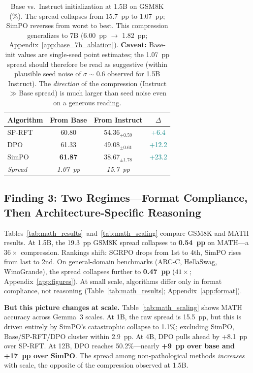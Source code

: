 \documentclass{article}
\newcommand{\sprft}{SP-RFT}
\begin{document}
\begin{table}[t]
\centering
\caption{Base vs.\ Instruct initialization at 1.5B on GSM8K (\%). The spread collapses from 15.7~pp to 1.07~pp; SimPO reverses from worst to best. This compression generalizes to 7B (6.00~pp $\to$ 1.82~pp; Appendix~\ref{app:base_7b_ablation}). \textbf{Caveat:} Base-init values are single-seed point estimates; the 1.07~pp spread should therefore be read as suggestive (within plausible seed noise of $\sigma{\sim}0.6$ observed for 1.5B Instruct). The \emph{direction} of the compression (Instruct$\gg$Base spread) is much larger than seed noise even on a generous reading.}
\label{tab:base_ablation}
\small
\begin{tabular}{@{}lccc@{}}
\toprule
\textbf{Algorithm} & \textbf{From Base} & \textbf{From Instruct} & \textbf{$\Delta$} \\
\midrule
\sprft{} & 60.80 & 54.36$_{\pm 0.59}$ & \textcolor{teal}{+6.4} \\
DPO & 61.33 & 49.08$_{\pm 0.61}$ & \textcolor{teal}{+12.2} \\
SimPO & \textbf{61.87} & 38.67$_{\pm 1.78}$ & \textcolor{teal}{+23.2} \\
\midrule
\textit{Spread} & \textit{1.07~pp} & \textit{15.7~pp} & \\
\bottomrule
\end{tabular}
\end{table}

\subsection{Finding 3: Two Regimes---Format Compliance, Then Architecture-Specific Reasoning}
\label{sec:format_compliance}

Tables~\ref{tab:math_results}~and~\ref{tab:math_scaling} compare GSM8K and MATH results. At 1.5B, the 19.3~pp GSM8K spread collapses to \textbf{0.54~pp} on MATH---a $36\times$ compression. Rankings shift: SGRPO drops from 1st to 4th, SimPO rises from last to 2nd. On general-domain benchmarks (ARC-C, HellaSwag, WinoGrande), the spread collapses further to \textbf{0.47~pp} ($41\times$; Appendix~\ref{app:figures}). At small scale, algorithms differ only in format compliance, not reasoning (Table~\ref{tab:math_results}; Appendix~\ref{app:format}).

\textbf{But this picture changes at scale.} Table~\ref{tab:math_scaling} shows MATH accuracy across Gemma~3 scales. At 1B, the raw spread is 15.5~pp, but this is driven entirely by SimPO's catastrophic collapse to 1.1\%; excluding SimPO, Base/\sprft{}/DPO cluster within 2.9~pp. At 4B, DPO pulls ahead by +8.1~pp over \sprft{}. At 12B, DPO reaches 50.2\%---nearly \textbf{+9~pp over base and +17~pp over SimPO}. The spread among non-pathological methods \emph{increases} with scale, the opposite of the compression observed at 1.5B.
\end{document}
